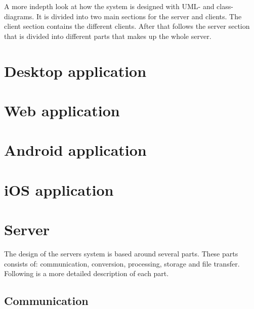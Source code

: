 
A more indepth look at how the system is designed with UML- and class-diagrams. It is divided into two main sections for the server and clients. The client section contains the different clients. After that follows the server section that is divided into different parts that makes up the whole server. 

\section{Desktop application}

\FloatBarrier

\section{Web application}


\FloatBarrier

\section{Android application}

\FloatBarrier

\section{iOS application}

\FloatBarrier

\section{Server}
The design of the servers system is based around several parts. These parts consists of: communication, conversion, processing, storage and file transfer. Following is a more detailed description of each part.

\subsection{Communication}

\FloatBarrier
